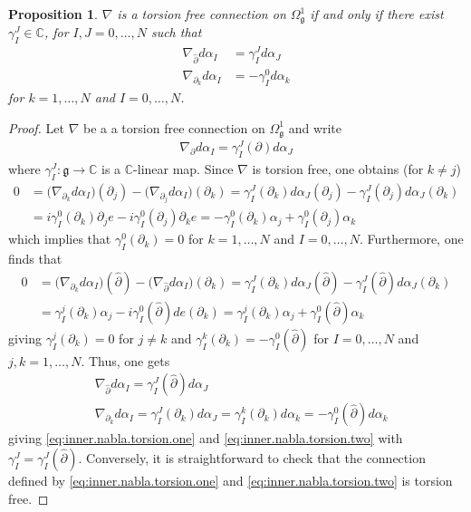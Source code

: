 \documentclass{amsart}
\newcommand{\complex}{\mathbb{C}}
\newcommand{\paraa}[1]{\big(#1\big)}
\newtheorem{proposition}[theorem]{Proposition}
\theoremstyle{definition}
\theoremstyle{remark}
\numberwithin{equation}{section}
\renewcommand{\d}{\partial}
\newcommand{\g}{\mathfrak{g}}
\renewcommand{\dh}{\hat{\partial}}
\newcommand{\Omegaoneg}{\Omega^1_{\g}}
\begin{document}
\begin{proposition}\label{prop:inner.der.torsion.free}
  $\nabla$ is a torsion free connection on $\Omegaoneg$ if and only if
  there exist $\gamma_I^J\in\complex$, for $I,J=0,\ldots,N$ such that
  \begin{align}
    \nabla_{\dh}d\alpha_I &= \gamma_I^Jd\alpha_J\label{eq:inner.nabla.torsion.two}\\
    \nabla_{\d_k}d\alpha_I &= -\gamma_I^0d\alpha_k\label{eq:inner.nabla.torsion.one}
  \end{align}
  for $k=1,\ldots,N$ and $I=0,\ldots,N$.
\end{proposition}

\begin{proof}
  Let $\nabla$ be a a torsion free connection on $\Omegaoneg$ and write
  \begin{align*}
    \nabla_{\d}d\alpha_I = \gamma_I^J(\d)d\alpha_J
  \end{align*}
  where $\gamma_I^J:\g\to\complex$ is a $\complex$-linear map. Since
  $\nabla$ is torsion free, one obtains (for $k\neq j$)
  \begin{align*}
    0 &= \paraa{\nabla_{\d_k}d\alpha_I}(\d_j)-\paraa{\nabla_{\d_j}d\alpha_I}(\d_k)
        = \gamma_I^J(\d_k)d\alpha_J(\d_j)
        -\gamma_I^J(\d_j)d\alpha_J(\d_k)\\
      &= i\gamma_I^0(\d_k)\d_je - i\gamma_I^0(\d_j)\d_ke
        = -\gamma_I^0(\d_k)\alpha_j + \gamma_I^0(\d_j)\alpha_k
  \end{align*}
  which implies that $\gamma_I^0(\d_k)=0$ for $k=1,\ldots,N$ and
  $I=0,\ldots,N$. Furthermore, one finds that
  \begin{align*}
    0 &= \paraa{\nabla_{\d_k}d\alpha_I}(\dh)-\paraa{\nabla_{\dh}d\alpha_I}(\d_k)
        =\gamma_I^J(\d_k)d\alpha_J(\dh)
        -\gamma_I^J(\dh)d\alpha_J(\d_k)\\
      &= \gamma_I^j(\d_k)\alpha_j
        -i\gamma_I^0(\dh)de(\d_k)
       = \gamma_I^j(\d_k)\alpha_j
        +\gamma_I^0(\dh)\alpha_k
  \end{align*}
  giving $\gamma_I^j(\d_k)=0$ for $j\neq k$ and
  $\gamma_I^k(\d_k)=-\gamma_I^0(\dh)$ for $I=0,\ldots,N$ and
  $j,k=1,\ldots,N$. Thus, one gets
  \begin{align*}
    &\nabla_{\dh}d\alpha_I = \gamma_I^J(\dh)d\alpha_J\\
    &\nabla_{\d_k}d\alpha_I = \gamma_I^J(\d_k)d\alpha_J
      =\gamma_I^k(\d_k)d\alpha_k
      =-\gamma_I^0(\dh)d\alpha_k
  \end{align*}
  giving \eqref{eq:inner.nabla.torsion.one} and
  \eqref{eq:inner.nabla.torsion.two} with
  $\gamma_I^J=\gamma_I^J(\dh)$. Conversely, it is straightforward to
  check that the connection defined by
  \eqref{eq:inner.nabla.torsion.one} and
  \eqref{eq:inner.nabla.torsion.two} is torsion free.
\end{proof}
\end{document}
